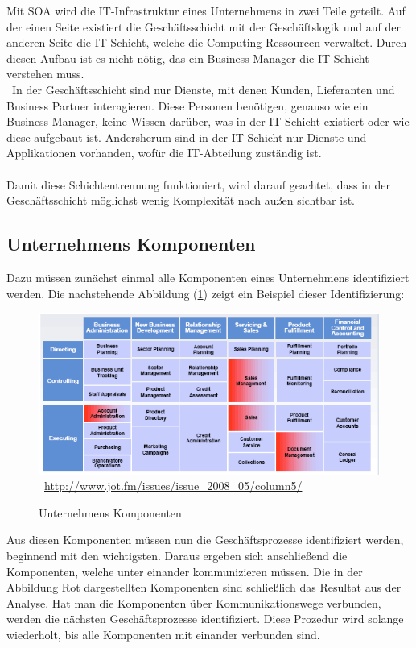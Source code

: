 Mit SOA wird die IT-Infrastruktur eines Unternehmens in zwei Teile geteilt. Auf der einen Seite existiert die Geschäftsschicht mit der Geschäftslogik und auf der anderen Seite die IT-Schicht, welche die Computing-Ressourcen verwaltet. Durch diesen Aufbau ist es nicht nötig, das ein Business Manager die IT-Schicht verstehen muss.
\\\
In der Geschäftsschicht sind nur Dienste, mit denen Kunden, Lieferanten und Business Partner interagieren. Diese Personen benötigen, genauso wie ein Business Manager, keine Wissen darüber, was in der IT-Schicht existiert oder wie diese aufgebaut ist. Andersherum sind in der IT-Schicht nur Dienste und Applikationen vorhanden, wofür die IT-Abteilung zuständig ist.
\\\\
Damit diese Schichtentrennung funktioniert, wird darauf geachtet, dass in der Geschäftsschicht möglichst wenig Komplexität nach außen sichtbar ist.

\subsection{Unternehmens Komponenten}
\label{subsec:UnternehmensKomponenten}
Dazu müssen zunächst einmal alle Komponenten eines Unternehmens identifiziert werden. Die nachstehende Abbildung (\ref{fig:UnternehmensKomponenten}) zeigt ein Beispiel dieser Identifizierung:

\begin{figure}[htb]
    \centering 
    \includegraphics[width=\linewidth]{content/images/UnternehmensKomponenten}\
    \quelle\url{http://www.jot.fm/issues/issue_2008_05/column5/}
    \caption[Unternehmens Komponenten]{Unternehmens Komponenten\\}
    \label{fig:UnternehmensKomponenten}  
\end{figure} 
\newpage
Aus diesen Komponenten müssen nun die Geschäftsprozesse identifiziert werden, beginnend mit den wichtigsten. Daraus ergeben sich anschließend die Komponenten, welche unter einander kommunizieren müssen. Die in der Abbildung Rot dargestellten Komponenten sind schließlich das Resultat aus der Analyse. Hat man die Komponenten über Kommunikationswege verbunden, werden die nächsten Geschäftsprozesse identifiziert. Diese Prozedur wird solange wiederholt, bis alle Komponenten mit einander verbunden sind.

